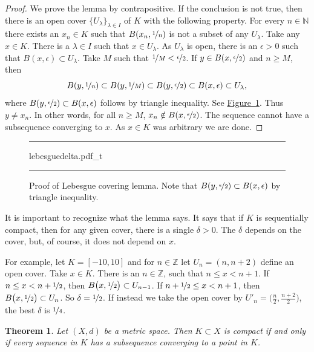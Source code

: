 \documentclass[12pt,openany]{book}
\newcommand{\Z}{{\mathbb{Z}}}
\newcommand{\N}{{\mathbb{N}}}
\theoremstyle{plain}
\newtheorem{thm}{Theorem}[section]
\theoremstyle{remark}
\theoremstyle{definition}
\newenvironment{myfig}{%
\begin{figure}[h!t]
\noindent\rule{\textwidth}{0.5pt}\vspace{12pt}\par\centering}%
{\par\noindent\rule{\textwidth}{0.5pt}
\end{figure}}
\theoremstyle{exercise}
\theoremstyle{example}
\newcommand{\figureref}[1]{\hyperref[#1]{Figure~\ref*{#1}}}
\begin{document}
\begin{proof}
We prove the lemma by contrapositive.
If the conclusion is not true, then
there is
an open cover $\{ U_\lambda \}_{\lambda \in I}$ of $K$ with
the following property.
For every $n \in \N$ there exists an $x_n \in K$ such that
$B(x_n,\nicefrac{1}{n})$ is not a subset of any $U_\lambda$.
Take any $x \in K$.  There is
a $\lambda \in I$ such that $x \in U_\lambda$.  As $U_\lambda$ is open,
there is an $\epsilon > 0$ 
such that $B(x,\epsilon) \subset U_\lambda$.  Take $M$ such that
$\nicefrac{1}{M} < \nicefrac{\epsilon}{2}$.  If $y \in 
B(x,\nicefrac{\epsilon}{2})$ and $n \geq M$, then 
\begin{equation*}
B(y,\nicefrac{1}{n}) \subset
B(y,\nicefrac{1}{M}) \subset
B(y,\nicefrac{\epsilon}{2}) \subset B(x,\epsilon)
\subset U_\lambda ,
\end{equation*}
where 
$B(y,\nicefrac{\epsilon}{2}) \subset B(x,\epsilon)$
follows by triangle inequality.
See \figureref{fig:lebesguedelta}.
Thus $y \neq x_n$.
In other words, for all $n \geq M$, $x_n \notin B(x,\nicefrac{\epsilon}{2})$. 
The sequence cannot have a subsequence converging to $x$.  As $x \in K$ was
arbitrary we are done.
\end{proof}

\begin{myfig}
{lebesguedelta.pdf_t}
\caption{Proof of Lebesgue covering lemma.
Note that $B(y,\nicefrac{\epsilon}{2}) \subset
B(x,\epsilon)$ by triangle inequality.\label{fig:lebesguedelta}}
\end{myfig}

It is important to recognize what the lemma says.  It says that
if $K$ is sequentially compact, then for any given
cover, there is a single $\delta > 0$.  The $\delta$ depends on the cover,
but, of course, it does not depend on $x$.

For example, let $K = [-10,10]$ and for $n \in \Z$ let $U_n =
(n,n+2)$ define an open cover.
Take $x \in K$. There is an $n \in \Z$, 
such that $n \leq x < n+1$.
If $n \leq x < n+\nicefrac{1}{2}$, then
$B\bigl(x,\nicefrac{1}{2}\bigr) \subset U_{n-1}$.
If $n+ \nicefrac{1}{2} \leq x < n+1$, then
$B\bigl(x,\nicefrac{1}{2}\bigr) \subset U_{n}$.  So $\delta =
\nicefrac{1}{2}$.  If instead we take the open cover by $U'_n =
\bigl(\frac{n}{2},\frac{n+2}{2} \bigr)$, the best $\delta$ is $\nicefrac{1}{4}$.

\begin{thm} \label{thm:mscompactisseqcpt}
Let $(X,d)$ be a metric space.  Then $K \subset X$ is compact if
and only if every sequence in $K$ has a subsequence converging to
a point in $K$.
\end{thm}
\end{document}
